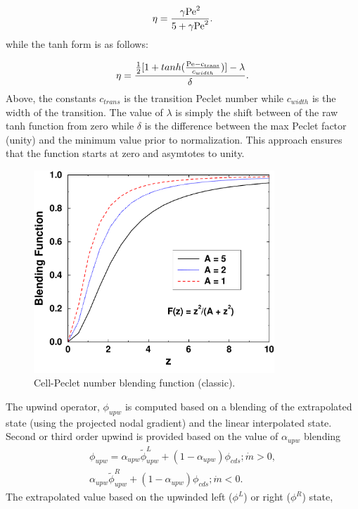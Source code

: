 \begin{equation}
  \eta = \frac {{\gamma \rm Pe}^2} {5 + {\gamma \rm Pe}^2}.
\end{equation}
while the tanh form is as follows:

\begin{equation}
  \eta = \frac {\frac {1}{2}[1+tanh(\frac{\rm Pe - c_{trans}}{c_{width}})] -\lambda}{\delta}.
\end{equation}
Above, the constants $c_{trans}$ is the transition Peclet number while $c_{width}$ is the width of 
the transition. The value of $\lambda$ is simply the shift between of the raw tanh function
from zero while $\delta$ is the difference between the max Peclet factor (unity) and the minimum value
prior to normalization. This approach ensures that the function starts at zero and asymtotes to unity. 

\begin{figure} [h]
\centerline{\includegraphics[height=3.0in]{images/peclet}}
\vspace{0.1in}
\caption{Cell-Peclet number blending function (classic).}
\label{pec-blend}
\end{figure}
 
The upwind operator, $\phi_{upw}$ is computed based on a blending of the extrapolated
state (using the projected nodal gradient) and the linear interpolated state. Second 
or third order upwind is provided based on the value of $\alpha_{upw}$ blending
\begin{eqnarray}
 \phi_{upw} = \alpha_{upw}\tilde \phi^L_{upw} + \left(1-\alpha_{upw}\right)\phi_{cds}; \dot m > 0, \nonumber \\
             \alpha_{upw}\tilde\phi^R_{upw} + \left(1-\alpha_{upw}\right)\phi_{cds}; \dot m < 0.
\label{phiUpwindFull}
\end{eqnarray}
The extrapolated value based on the upwinded left ($\phi^L$) or right ($\phi^R$) state,

